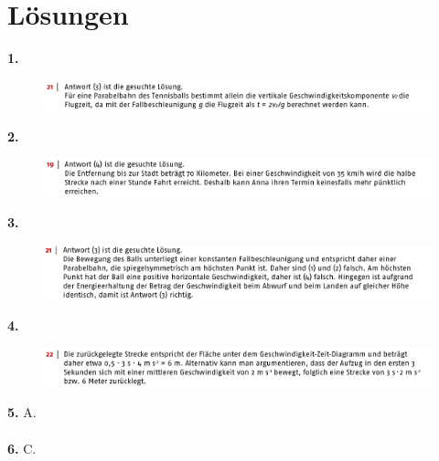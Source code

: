 \documentclass[11pt]{article}
\begin{document}
\section{Lösungen}
\textbf{1.} 
\begin{figure}[H]
    \centering
        \includegraphics[width=\textwidth]{aufgabe-1-l.png}
\end{figure} 
\noindent\textbf{2.} 
\begin{figure}[H]
    \centering
        \includegraphics[width=\textwidth]{aufgabe-2-l.png}
\end{figure} 
\noindent\textbf{3.} 
\begin{figure}[H]
    \centering
        \includegraphics[width=\textwidth]{aufgabe-3-l.png}
\end{figure} 
\noindent\textbf{4.} 
\begin{figure}[H]
    \centering
        \includegraphics[width=\textwidth]{aufgabe-4-l.png}
\end{figure} 
\noindent\textbf{5.} A. \\\\
\noindent\textbf{6.} C. \\\\
\end{document}
